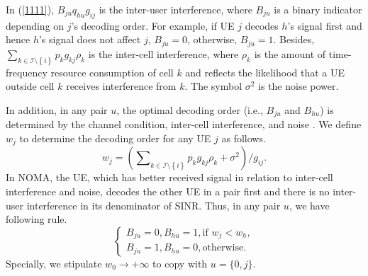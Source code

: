 \documentclass[10pt,journal,final,finalsubmission,twocolumn]{IEEEtran}
\begin{document}
In (\ref{1111}), $B_{ju}q_{hu}g_{ij}$ is the inter-user interference, where $B_{ju}$ is a binary indicator depending on $j$'s decoding order. For example, if UE $j$ decodes $h$'s signal first and hence $h$'s signal does not affect $j$, $B_{ju} = 0$, otherwise, $B_{ju} = 1$. Besides, ${\sum_{k\in \mathcal{I}\setminus \left \{ i \right \}}p_kg_{kj}\rho_k}$ is the inter-cell interference, where $\rho_k$ is the amount of time-frequency resource consumption of cell $k$ and reflects the likelihood that a UE outside cell $k$ receives interference from $k$. The symbol $\sigma^2$ is the noise power.

In addition, in any pair $u$, the optimal decoding order (i.e., $B_{ju}$ and $B_{hu}$) is determined by the channel condition, inter-cell interference, and noise \cite{41}. We define $w_j$ to determine the decoding order for any UE $j$ as follows. 
\begin{equation}
w_j=  \left(\sum \nolimits_{k \in \mathcal{I}\setminus \left \{ i \right \} }p_k g_{kj}\rho_k+\sigma ^2   \right) / g_{ij} .
\end{equation}
In NOMA, the UE, which has better received signal in relation to inter-cell interference and noise, decodes the other UE in a pair first and there is no inter-user interference in its denominator of SINR. Thus, in any pair $u$, we have following rule. 
\begin{equation}\label{rule}
\left\{\begin{array}{l}
B_{ju} = 0,B_{hu} =1, \text{if } w_j < w_h,\\
B_{ju} = 1,B_{hu} =0, \text{otherwise}.
\end{array}\right.
\end{equation}
Specially, we stipulate $w_0\rightarrow +\infty $ to copy with $u=\{0,j\}$.
\end{document}
